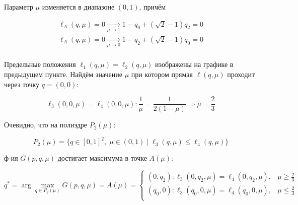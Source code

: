 \begin{flushleft}
	Параметр $\mu$ изменяется в диапазоне $(0,1)$, причём	
	
	\begin{gather*}	
	\ell_A(q,\mu) =0\xrightarrow[\mu\rightarrow 1]{} 
	1-q_0+(\sqrt{2}-1)q_2=0\\	
	\ell_A(q,\mu)=0 \xrightarrow[\mu\rightarrow 0]{} 	
	1-q_2+(\sqrt{2}-1)q_0=0\\
	\end{gather*}
	
	Предельные положения $\ell_1(q, \mu)=\ell_2(q, \mu)$ изображены на графике 
	в предыдущем пункте. Найдём значение $\mu$ при котором прямая 
	$\ell(q, \mu)$ проходит через точку
	$q=(0,0)$:
	
	$$\ell_3(0,0,\mu) = \ell_4(0,0,\mu) : \frac{1}{\mu}=\frac{1}{2(1-\mu)} 
	\Rightarrow \mu = \frac{2}{3}$$
	
	Очевидно, что на полиэдре $P_2(\mu):$
	
	$$P_2(\mu)=\{q \in [0,1]^2, \; \mu \in (0,1) \; | 
	\;  \ell_3(q, \mu) \leqslant \ell_4(q, \mu) \}$$
	
	ф-ия $\overline{G}(p,q,\mu)$ достигает максимума в точке $A(\mu):$
	
	$$
	q^*= \arg \max \limits_{q\in P_2(\mu)} \overline G(p,q,\mu) = A(\mu)=
	\begin{cases}
		(0, q_2) : \ell_3(0,q_2,\mu)=\ell_4(0,q_2,\mu), & \mu \geqslant \frac{2}{3} \\
		(q_0, 0) : \ell_3(q_0,0,\mu)=\ell_4(q_0,0,\mu), & \mu \leqslant \frac{2}{3} \\
	\end{cases}	
	$$
	

\end{flushleft}
